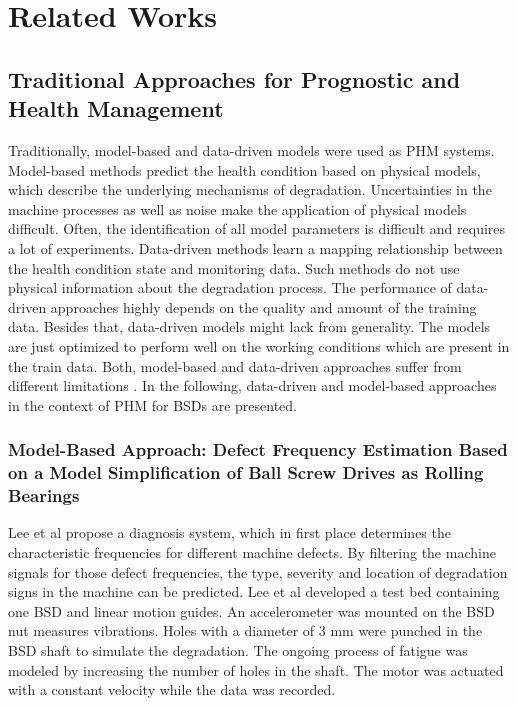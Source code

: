 
\chapter{Related Works}\label{chapter:related_works}


\section{Traditional Approaches for Prognostic and Health Management}

Traditionally, model-based and data-driven models were used as PHM systems. Model-based methods predict the health condition based on physical models, which describe the underlying mechanisms of degradation. Uncertainties in the machine processes as well as noise make the application of physical models difficult. Often, the identification of all model parameters is difficult and requires a lot of experiments. Data-driven methods learn a mapping relationship between the health condition state and monitoring data. Such methods do not use physical information about the degradation process. The performance of data-driven approaches highly depends on the quality and amount of the training data. Besides that, data-driven models might lack from generality. The models are just optimized to perform well on the working conditions which are present in the train data. Both, model-based and data-driven approaches suffer from different limitations \cite{DENG2020}. In the following, data-driven and model-based approaches in the context of PHM for BSDs are presented. 

\subsection{Model-Based Approach: Defect Frequency Estimation Based on a Model Simplification of Ball Screw Drives as Rolling Bearings}
Lee et al \cite{Lee2015} propose a diagnosis system, which in first place determines the characteristic frequencies for different machine defects. By filtering the machine signals for those defect frequencies, the type, severity and location of degradation signs in the machine can be predicted. Lee et al developed a test bed containing one BSD and linear motion guides. An accelerometer was mounted on the BSD nut measures vibrations. Holes with a diameter of 3 mm were punched in the BSD shaft to simulate the degradation. The ongoing process of fatigue was modeled by increasing the number of holes in the shaft. The motor was actuated with a constant velocity while the data was recorded.

